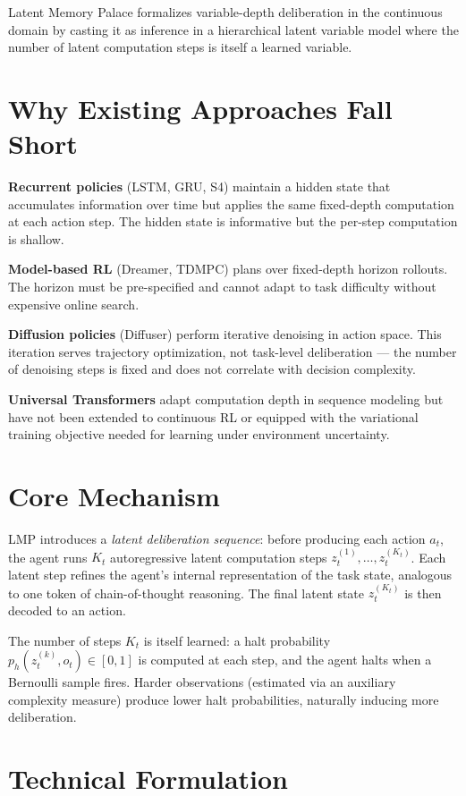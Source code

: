 \documentclass[10pt,twocolumn]{article}
\begin{document}
Latent Memory Palace formalizes variable-depth deliberation in the
continuous domain by casting it as inference in a hierarchical latent
variable model where the number of latent computation steps is itself
a learned variable.

\section{Why Existing Approaches Fall Short}

\textbf{Recurrent policies} (LSTM, GRU, S4) maintain a hidden state
that accumulates information over time but applies the same fixed-depth
computation at each action step. The hidden state is informative but
the per-step computation is shallow.

\textbf{Model-based RL} (Dreamer, TDMPC) plans over fixed-depth horizon
rollouts. The horizon must be pre-specified and cannot adapt to task
difficulty without expensive online search.

\textbf{Diffusion policies} (Diffuser) perform iterative denoising in
action space. This iteration serves trajectory optimization, not
task-level deliberation --- the number of denoising steps is fixed and
does not correlate with decision complexity.

\textbf{Universal Transformers} adapt computation depth in sequence
modeling but have not been extended to continuous RL or equipped with
the variational training objective needed for learning under environment
uncertainty.

\section{Core Mechanism}

LMP introduces a \emph{latent deliberation sequence}: before producing
each action $a_t$, the agent runs $K_t$ autoregressive latent computation
steps $z_t^{(1)}, \ldots, z_t^{(K_t)}$. Each latent step refines the
agent's internal representation of the task state, analogous to one
token of chain-of-thought reasoning. The final latent state $z_t^{(K_t)}$
is then decoded to an action.

The number of steps $K_t$ is itself learned: a halt probability
$p_h(z_t^{(k)}, o_t) \in [0,1]$ is computed at each step, and the
agent halts when a Bernoulli sample fires. Harder observations
(estimated via an auxiliary complexity measure) produce lower halt
probabilities, naturally inducing more deliberation.

\section{Technical Formulation}
\end{document}
